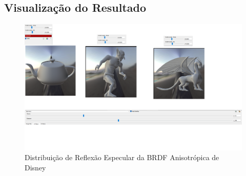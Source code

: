 \subsection{Visualização do Resultado}
    \begin{figure}[h]
        \centering
        \includegraphics[scale=1.9, width=\textwidth]{Imagens/brdfs/aniso.png}
    \caption{Distribuição de Reflexão Especular da BRDF Anisotrópica de Disney}
    \label{fig:disney_anisotropic_specular}
\end{figure}
